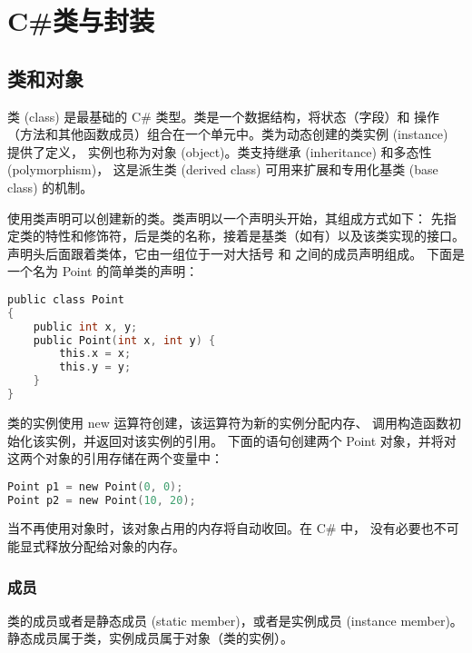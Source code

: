 ﻿%

\chapter{C\#类与封装}

\section{类和对象}
类 (class) 是最基础的 C\# 类型。类是一个数据结构，将状态（字段）和
操作（方法和其他函数成员）组合在一个单元中。类为动态创建的类实例 (instance) 提供了定义，
实例也称为对象 (object)。类支持继承 (inheritance) 和多态性 (polymorphism)，
这是派生类 (derived class) 可用来扩展和专用化基类 (base class) 的机制。

使用类声明可以创建新的类。类声明以一个声明头开始，其组成方式如下：
先指定类的特性和修饰符，后是类的名称，接着是基类（如有）以及该类实现的接口。
声明头后面跟着类体，它由一组位于一对大括号 { 和 } 之间的成员声明组成。
下面是一个名为 Point 的简单类的声明：

 \begin{lstlisting}[language=C]
public class Point
{
    public int x, y;
    public Point(int x, int y) {
        this.x = x;
        this.y = y;
    }
}
\end{lstlisting}

类的实例使用 new 运算符创建，该运算符为新的实例分配内存、
调用构造函数初始化该实例，并返回对该实例的引用。
下面的语句创建两个 Point 对象，并将对这两个对象的引用存储在两个变量中：

 \begin{lstlisting}[language=C]
Point p1 = new Point(0, 0);
Point p2 = new Point(10, 20);
\end{lstlisting}

当不再使用对象时，该对象占用的内存将自动收回。在 C\# 中，
没有必要也不可能显式释放分配给对象的内存。

\subsection{成员}
类的成员或者是静态成员 (static member)，或者是实例成员 (instance member)。
静态成员属于类，实例成员属于对象（类的实例）。

